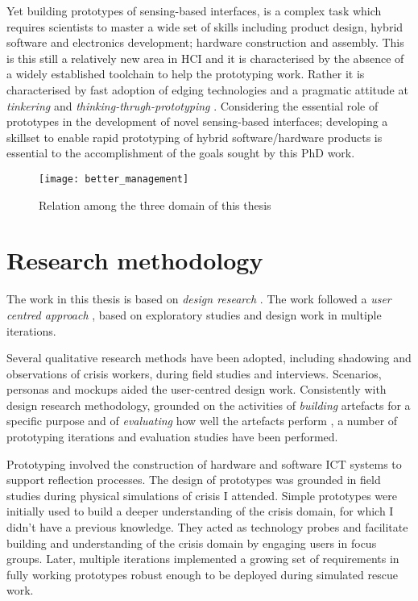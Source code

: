 Yet building prototypes of sensing-based interfaces, is a complex task which requires scientists to master a wide set of skills including product design, hybrid software and electronics development; hardware construction and assembly. This is this still a relatively new area in HCI and it is characterised by the absence of a widely established toolchain to help the prototyping work. Rather it is characterised by fast adoption of edging technologies and a pragmatic attitude at \emph{tinkering} and \emph{thinking-thrugh-prototyping} \autocite{Klemmer:2006ez}. Considering the essential role of prototypes in the development of novel sensing-based interfaces; developing a skillset to enable rapid prototyping of hybrid software/hardware products is essential to the accomplishment of the goals sought by this PhD work.
\begin{figure}
	[tbh] \centering 
	\texttt{[image: better\_management]} \caption{Relation among the three domain of this thesis} \label{fig:topic_relation} 
\end{figure}

\section{Research methodology}\label{research-methodology}

The work in this thesis is based on \emph{design research} \autocites{Hevner:2010fy}{March:1995gm}. The work followed a \emph{user centred approach} \autocites{MAGUIRE:2001dp}{Gulliksen:2003hd}, based on exploratory studies and design work in multiple iterations.

Several qualitative research methods \autocite{robson1993real} have been adopted, including shadowing and observations of crisis workers, during field studies and interviews. Scenarios, personas and mockups aided the user-centred design work. Consistently with design research methodology, grounded on the activities of \emph{building} artefacts for a specific purpose and of \emph{evaluating} how well the artefacts perform \autocite{March:1995gm}, a number of prototyping iterations and evaluation studies have been performed.

Prototyping involved the construction of hardware and software ICT systems to support reflection processes. The design of prototypes was grounded in field studies during physical simulations of crisis I attended. Simple prototypes were initially used to build a deeper understanding of the crisis domain, for which I didn't have a previous knowledge. They acted as technology probes \autocite{Hutchinson:2003il} and facilitate building and understanding of the crisis domain by engaging users in focus groups. Later, multiple iterations implemented a growing set of requirements in fully working prototypes robust enough to be deployed during simulated rescue work.

